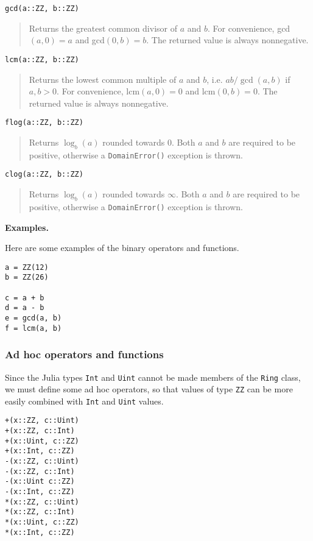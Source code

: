 \documentclass[a4paper,10pt]{article}
\newcommand{\code}{\lstinline}
\newcommand{\desc}[1]{\vspace{-3mm}\begin{quote}#1\end{quote}}
\begin{document}
{{{\begin{lstlisting}
gcd(a::ZZ, b::ZZ)
\end{lstlisting}

\desc{Returns the greatest common divisor of $a$ and $b$. For convenience, 
gcd$(a, 0) = a$ and gcd$(0, b) = b$. The returned value is always nonnegative.}

\begin{lstlisting}
lcm(a::ZZ, b::ZZ)
\end{lstlisting}

\desc{Returns the lowest common multiple of $a$ and $b$, i.e. $ab/\gcd(a, b)$ if
$a, b > 0$. For convenience, lcm$(a, 0) = 0$ and lcm$(0, b) = 0$. The returned
value is always nonnegative.}

\begin{lstlisting}
flog(a::ZZ, b::ZZ)
\end{lstlisting}

\desc{Returns $\log_b(a)$ rounded towards $0$. Both $a$ and $b$ are required
to be positive, otherwise a \code{DomainError()} exception is thrown.}

\begin{lstlisting}
clog(a::ZZ, b::ZZ)
\end{lstlisting}

\desc{Returns $\log_b(a)$ rounded towards $\infty$. Both $a$ and $b$ are required
to be positive, otherwise a \code{DomainError()} exception is thrown.}

\textbf{Examples.}

Here are some examples of the binary operators and functions.

\begin{lstlisting}
a = ZZ(12)
b = ZZ(26)

c = a + b
d = a - b
e = gcd(a, b)
f = lcm(a, b)
\end{lstlisting}

\subsubsection{Ad hoc operators and functions}

Since the Julia types \code{Int} and \code{Uint} cannot be made members of the
\code{Ring} class, we must define some ad hoc operators, so that values of type
\code{ZZ} can be more easily combined with \code{Int} and \code{Uint} values.

\begin{lstlisting}
+(x::ZZ, c::Uint)
+(x::ZZ, c::Int)
+(x::Uint, c::ZZ)
+(x::Int, c::ZZ)
-(x::ZZ, c::Uint)
-(x::ZZ, c::Int)
-(x::Uint c::ZZ)
-(x::Int, c::ZZ)
*(x::ZZ, c::Uint)
*(x::ZZ, c::Int)
*(x::Uint, c::ZZ)
*(x::Int, c::ZZ)
\end{lstlisting}

}}}
\end{document}
